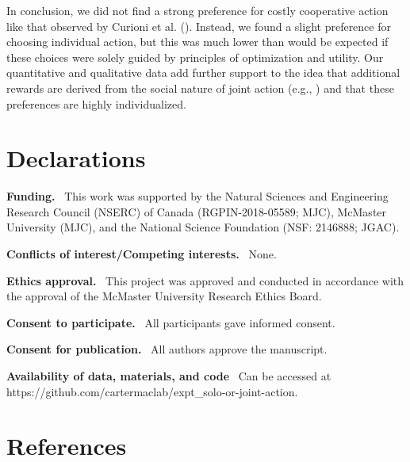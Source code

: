 \documentclass[
  man,
  floatsintext,
  longtable,
  nolmodern,
  notxfonts,
  notimes,
  colorlinks=true,linkcolor=blue,citecolor=blue,urlcolor=blue]{apa7}
\begin{document}
In conclusion, we did not find a strong preference for costly
cooperative action like that observed by Curioni et al.
(). Instead, we found a slight
preference for choosing individual action, but this was much lower than
would be expected if these choices were solely guided by principles of
optimization and utility. Our quantitative and qualitative data add
further support to the idea that additional rewards are derived from the
social nature of joint action (e.g., ) and that these preferences are highly individualized.

\vfill

\section{Declarations}\label{declarations}

\noindent \textbf{Funding.} ~This work was supported by the Natural
Sciences and Engineering Research Council (NSERC) of Canada
(RGPIN-2018-05589; MJC), McMaster University (MJC), and the National
Science Foundation (NSF: 2146888; JGAC).

\noindent \textbf{Conflicts of interest/Competing interests.} ~None.

\noindent \textbf{Ethics approval.} ~This project was approved and
conducted in accordance with the approval of the McMaster University
Research Ethics Board.

\noindent \textbf{Consent to participate.} ~All participants gave
informed consent.

\noindent \textbf{Consent for publication.} ~All authors approve the
manuscript.

\noindent \textbf{Availability of data, materials, and code} ~Can be
accessed at https://github.com/cartermaclab/expt\_solo-or-joint-action.

\newpage

\section{References}\label{references}
\end{document}
